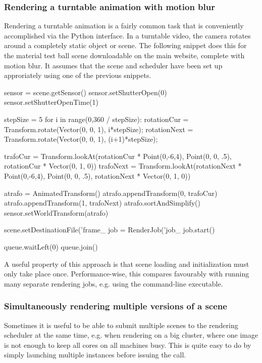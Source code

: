 \subsubsection{Rendering a turntable animation with motion blur}
Rendering a turntable animation is a fairly common task that is
conveniently accomplished via the Python interface. In a turntable
video, the camera rotates around a completely static object or scene.
The following snippet does this for the material test ball scene downloadable
on the main website, complete with motion blur. It assumes that the
scene and scheduler have been set up approriately using one of the previous
snippets.
\begin{python}
sensor = scene.getSensor()
sensor.setShutterOpen(0)
sensor.setShutterOpenTime(1)

stepSize = 5
for i in range(0,360 / stepSize):
    rotationCur  = Transform.rotate(Vector(0, 0, 1), i*stepSize);
    rotationNext = Transform.rotate(Vector(0, 0, 1), (i+1)*stepSize);

    trafoCur  = Transform.lookAt(rotationCur  * Point(0,-6,4),
        Point(0, 0, .5), rotationCur  * Vector(0, 1, 0))
    trafoNext = Transform.lookAt(rotationNext * Point(0,-6,4),
        Point(0, 0, .5), rotationNext * Vector(0, 1, 0))

    atrafo = AnimatedTransform()
    atrafo.appendTransform(0, trafoCur)
    atrafo.appendTransform(1, trafoNext)
    atrafo.sortAndSimplify()
    sensor.setWorldTransform(atrafo)

    scene.setDestinationFile('frame_%
    job = RenderJob('job_%
    job.start()

    queue.waitLeft(0)
    queue.join()
\end{python}
A useful property of this approach is that scene loading and initialization
must only take place once. Performance-wise, this compares favourably with
running many separate rendering jobs, e.g. using the 
command-line executable.

\subsubsection{Simultaneously rendering multiple versions of a scene}
Sometimes it is useful to be able to submit multiple scenes to the rendering scheduler
at the same time, e.g. when rendering on a big cluster, where one image is not enough to keep all
cores on all machines busy. This is quite easy to do by simply launching multiple 
instances before issuing the  call.

